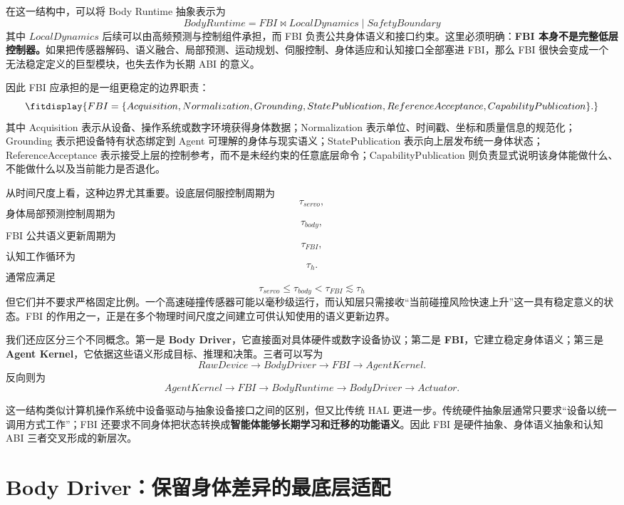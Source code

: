 在这一结构中，可以将 Body Runtime 抽象表示为
\[
\boxed{
BodyRuntime
=
FBI
\bowtie
LocalDynamics
\mid
SafetyBoundary
}
\]
其中 \(LocalDynamics\) 后续可以由高频预测与控制组件承担，而 FBI 负责公共身体语义和接口约束。这里必须明确：\textbf{FBI 本身不是完整低层控制器。}如果把传感器解码、语义融合、局部预测、运动规划、伺服控制、身体适应和认知接口全部塞进 FBI，那么 FBI 很快会变成一个无法稳定定义的巨型模块，也失去作为长期 ABI 的意义。

因此 FBI 应承担的是一组更稳定的边界职责：
\[
\fitdisplay{
FBI
=
\{
Acquisition,
Normalization,
Grounding,
StatePublication,
ReferenceAcceptance,
CapabilityPublication
\}.
}
\]
其中 Acquisition 表示从设备、操作系统或数字环境获得身体数据；Normalization 表示单位、时间戳、坐标和质量信息的规范化；Grounding 表示把设备特有状态绑定到 Agent 可理解的身体与现实语义；StatePublication 表示向上层发布统一身体状态；ReferenceAcceptance 表示接受上层的控制参考，而不是未经约束的任意底层命令；CapabilityPublication 则负责显式说明该身体能做什么、不能做什么以及当前能力是否退化。

从时间尺度上看，这种边界尤其重要。设底层伺服控制周期为
\[
\tau_{servo},
\]
身体局部预测控制周期为
\[
\tau_{body},
\]
FBI 公共语义更新周期为
\[
\tau_{FBI},
\]
认知工作循环为
\[
\tau_h.
\]
通常应满足
\[
\boxed{
\tau_{servo}
\leq
\tau_{body}
<
\tau_{FBI}
\lesssim
\tau_h
}
\]
但它们并不要求严格固定比例。一个高速碰撞传感器可能以毫秒级运行，而认知层只需接收“当前碰撞风险快速上升”这一具有稳定意义的状态。FBI 的作用之一，正是在多个物理时间尺度之间建立可供认知使用的语义更新边界。

我们还应区分三个不同概念。第一是 \textbf{Body Driver}，它直接面对具体硬件或数字设备协议；第二是 \textbf{FBI}，它建立稳定身体语义；第三是 \textbf{Agent Kernel}，它依据这些语义形成目标、推理和决策。三者可以写为
\[
RawDevice
\rightarrow
BodyDriver
\rightarrow
FBI
\rightarrow
AgentKernel.
\]
反向则为
\[
AgentKernel
\rightarrow
FBI
\rightarrow
BodyRuntime
\rightarrow
BodyDriver
\rightarrow
Actuator.
\]

这一结构类似计算机操作系统中设备驱动与抽象设备接口之间的区别，但又比传统 HAL 更进一步。传统硬件抽象层通常只要求“设备以统一调用方式工作”；FBI 还要求不同身体把状态转换成\textbf{智能体能够长期学习和迁移的功能语义}。因此 FBI 是硬件抽象、身体语义抽象和认知 ABI 三者交叉形成的新层次。


\section{Body Driver：保留身体差异的最底层适配}

